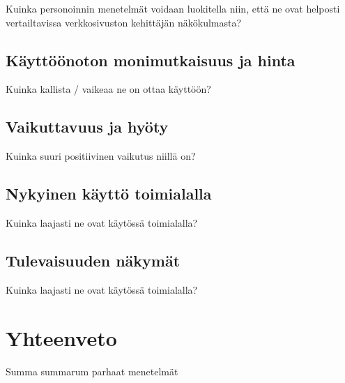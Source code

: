 \documentclass[finnish, 12pt, a4paper, elec, utf8, a-1b, online]{aaltothesis}
\begin{document}
Kuinka personoinnin menetelmät voidaan luokitella niin, että ne ovat helposti vertailtavissa verkkosivuston kehittäjän näkökulmasta?

\subsection{Käyttöönoton monimutkaisuus ja hinta}

Kuinka kallista / vaikeaa ne on ottaa käyttöön?

\subsection{Vaikuttavuus ja hyöty}

Kuinka suuri positiivinen vaikutus niillä on?

\subsection{Nykyinen käyttö toimialalla}

Kuinka laajasti ne ovat käytössä toimialalla?

\subsection{Tulevaisuuden näkymät}

Kuinka laajasti ne ovat käytössä toimialalla?

\clearpage

\section{Yhteenveto}

Summa summarum parhaat menetelmät

\clearpage

\thesisbibliography{}
\printbibliography{}
\end{document}
